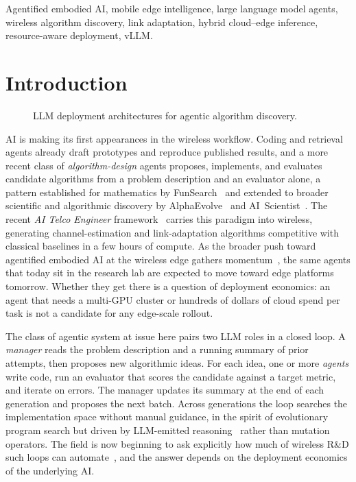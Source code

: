 \documentclass[journal]{IEEEtran}
\begin{document}
\begin{IEEEkeywords}
Agentified embodied AI, mobile edge intelligence, large language model agents, wireless algorithm discovery, link adaptation, hybrid cloud--edge inference, resource-aware deployment, vLLM.
\end{IEEEkeywords}

\section{Introduction}
\label{sec:intro}

\begin{figure}[!t]

\caption{LLM deployment architectures for agentic algorithm discovery.}
\label{fig:architecture}
\end{figure}

 AI is making its first appearances in the wireless workflow. Coding and retrieval agents already draft prototypes and reproduce published results, and a more recent class of \emph{algorithm-design} agents proposes, implements, and evaluates candidate algorithms from a problem description and an evaluator alone, a pattern established for mathematics by FunSearch~\cite{romeraparedes2024funsearch} and extended to broader scientific and algorithmic discovery by AlphaEvolve~\cite{novikov2025alphaevolve} and AI~Scientist~\cite{lu2024aiscientist}. The recent \emph{AI Telco Engineer} framework~\cite{aitaoudia2026aite} carries this paradigm into wireless, generating channel-estimation and link-adaptation algorithms competitive with classical baselines in a few hours of compute. As the broader push toward agentified embodied AI at the wireless edge gathers momentum~\cite{TODO_si_framing}, the same agents that today sit in the research lab are expected to move toward edge platforms tomorrow. Whether they get there is a question of deployment economics: an agent that needs a multi-GPU cluster or hundreds of dollars of cloud spend per task is not a candidate for any edge-scale rollout.

The class of agentic system at issue here pairs two LLM roles in a closed loop. A \emph{manager} reads the problem description and a running summary of prior attempts, then proposes new algorithmic ideas. For each idea, one or more \emph{agents} write code, run an evaluator that scores the candidate against a target metric, and iterate on errors. The manager updates its summary at the end of each generation and proposes the next batch. Across generations the loop searches the implementation space without manual guidance, in the spirit of evolutionary program search but driven by LLM-emitted reasoning~\cite{yao2023react, schick2023toolformer} rather than mutation operators. The field is now beginning to ask explicitly how much of wireless R\&D such loops can automate~\cite{bjornson2026automating, bariah2024llmtelecom, zhou2024llmtelecomsurvey}, and the answer depends on the deployment economics of the underlying AI.
\end{document}

